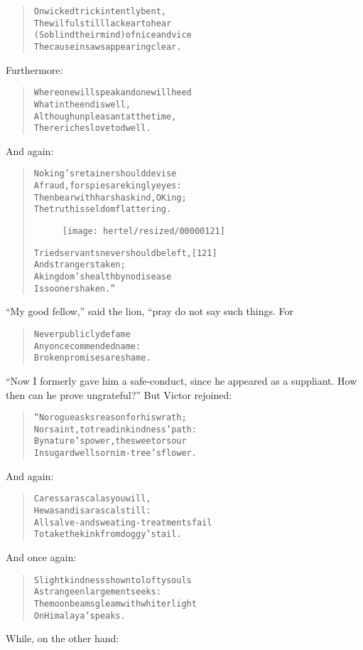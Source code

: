 \documentclass[article, twoside, 10pt]{memoir}
\renewenvironment{verbatim}{%
\begin{quote}%
\vskip -10pt%
\begin{alltt}\normalfont\small}{\end{alltt}%
\end{quote}%
\vskip -10pt
} %
\begin{document}
\begin{verbatim}
On wicked trick intently bent,
    The wilful still lack ear to hear
(So blind their mind) of nice and vice
    The cause in saws appearing clear.
\end{verbatim}
Furthermore:

\begin{verbatim}
Where one will speak and one will heed
    What in the end is well,
Although unpleasant at the time,
    There riches love to dwell.
\end{verbatim}
And again:

\begin{verbatim}
No king's retainer should devise
A fraud, for spies are kingly eyes:
Then bear with harsh as kind, O King;
The truth is seldom flattering.

\begin{figure}[p]\texttt{[image: hertel/resized/00000121]}\end{figure}Tried servants never should be left,                    [121]
    And strangers taken;
A kingdom's health by no disease
    Is sooner shaken.”
\end{verbatim}
``My good fellow,'' said the lion, “pray do not say such things.
For

\begin{verbatim}
Never publicly defame
Any once commended name:
Broken promises are shame.
\end{verbatim}
``Now I formerly gave him a safe-conduct, since he appeared as a suppliant. How then can he prove ungrateful?''
But Victor rejoined:

\begin{verbatim}
“No rogue asks reason for his wrath;
Nor saint, to tread in kindness' path:
By nature's power, the sweet or sour
In sugar dwells or nim-tree's flower.
\end{verbatim}
And again:

\begin{verbatim}
Caress a rascal as you will,
He was and is a rascal still:
All salve- and sweating-treatments fail
To take the kink from doggy's tail.
\end{verbatim}
And once again:

\begin{verbatim}
Slight kindness shown to lofty souls
A strange enlargement seeks:
The moonbeams gleam with whiter light
On Himalaya's peaks.
\end{verbatim}
While, on the other hand:
\end{document}
